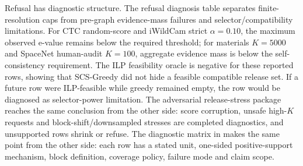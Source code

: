 \documentclass[10pt,twocolumn]{article}
\begin{document}
Refusal has diagnostic structure.
The refusal diagnosis table separates finite-resolution caps from pre-graph evidence-mass failures and selector/compatibility limitations.
For CTC random-score and iWildCam strict \(\alpha=0.10\), the maximum observed e-value remains below the required threshold; for materials \(K=5000\) and SpaceNet human-audit \(K=100\), aggregate evidence mass is below the self-consistency requirement.
The ILP feasibility oracle is negative for these reported rows, showing that SCS-Greedy did not hide a feasible compatible release set.
If a future row were ILP-feasible while greedy remained empty, the row would be diagnosed as selector-power limitation.
The adversarial release-stress package reaches the same conclusion from the other side: score corruption, unsafe high-\(K\) requests and block-shift/downsampled stresses are completed diagnostics, and unsupported rows shrink or refuse.
The diagnostic matrix in  makes the same point from the other side: each row has a stated unit, one-sided positive-support mechanism, block definition, coverage policy, failure mode and claim scope.
\end{document}
